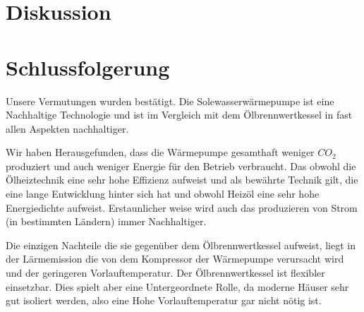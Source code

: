 \chapter{Diskussion}
\label{chap:fazit}

\chapter{Schlussfolgerung}

Unsere Vermutungen wurden bestätigt.
Die Solewasserwärmepumpe ist eine Nachhaltige Technologie und ist im Vergleich
mit dem Ölbrennwertkessel in fast allen Aspekten nachhaltiger.

Wir haben Herausgefunden, dass die Wärmepumpe gesamthaft weniger $CO_2$
produziert und auch weniger Energie für den Betrieb verbraucht. 
Das obwohl die Ölheiztechnik eine sehr hohe Effizienz aufweist und
als bewährte Technik gilt, die eine lange Entwicklung hinter sich hat und
obwohl Heizöl eine sehr hohe Energiedichte aufweist.
Erstaunlicher weise wird auch das produzieren von Strom (in bestimmten Ländern)
immer Nachhaltiger.

Die einzigen Nachteile die sie gegenüber dem Ölbrennwertkessel aufweist, liegt
in der Lärmemission die von dem Kompressor der Wärmepumpe verursacht wird
und der geringeren Vorlauftemperatur.
Der Ölbrennwertkessel ist flexibler einsetzbar.
Dies spielt aber eine Untergeordnete Rolle, da moderne Häuser sehr gut
isoliert werden, also eine Hohe Vorlauftemperatur gar nicht nötig ist.

